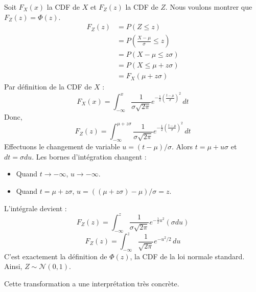 \begin{proofbox}
Soit $F_X(x)$ la CDF de $X$ et $F_Z(z)$ la CDF de $Z$. Nous voulons montrer que $F_Z(z) = \Phi(z)$.
\begin{align*}
F_Z(z) &= P(Z \le z) \\
&= P\left( \frac{X-\mu}{\sigma} \le z \right) \\
&= P(X - \mu \le z\sigma) \\
&= P(X \le \mu + z\sigma) \\
&= F_X(\mu + z\sigma)
\end{align*}
Par définition de la CDF de $X$ :
$$ F_X(x) = \int_{-\infty}^x \frac{1}{\sigma \sqrt{2\pi}} e^{ -\frac{1}{2} \left( \frac{t-\mu}{\sigma} \right)^2 } \, dt $$
Donc,
$$ F_Z(z) = \int_{-\infty}^{\mu + z\sigma} \frac{1}{\sigma \sqrt{2\pi}} e^{ -\frac{1}{2} \left( \frac{t-\mu}{\sigma} \right)^2 } \, dt $$
Effectuons le changement de variable $u = (t-\mu)/\sigma$. Alors $t = \mu + u\sigma$ et $dt = \sigma du$.
Les bornes d'intégration changent :
\begin{itemize}
    \item Quand $t \to -\infty$, $u \to -\infty$.
    \item Quand $t = \mu + z\sigma$, $u = ((\mu + z\sigma)-\mu)/\sigma = z$.
\end{itemize}
L'intégrale devient :
$$ F_Z(z) = \int_{-\infty}^{z} \frac{1}{\sigma \sqrt{2\pi}} e^{ -\frac{1}{2} u^2 } (\sigma du) $$
$$ F_Z(z) = \int_{-\infty}^{z} \frac{1}{\sqrt{2\pi}} e^{ -u^2/2 } \, du $$
C'est exactement la définition de $\Phi(z)$, la CDF de la loi normale standard. Ainsi, $Z \sim \mathcal{N}(0, 1)$.
\end{proofbox}

Cette transformation a une interprétation très concrète.

